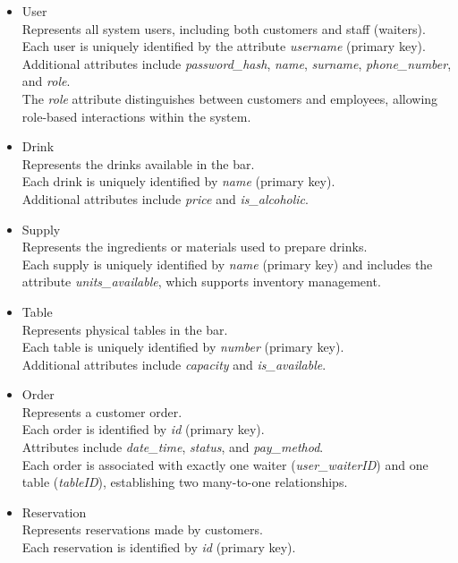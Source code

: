 \documentclass[a4paper]{article}
\begin{document}
\begin{itemize}
\item
  User\\
  Represents all system users, including both customers and staff
  (waiters).\\
  Each user is uniquely identified by the attribute \emph{username}
  (primary key).\\
  Additional attributes include \emph{password\_hash}, \emph{name},
  \emph{surname}, \emph{phone\_number}, and
  \emph{role}.\\
  The \emph{role} attribute distinguishes between customers and
  employees, allowing role-based interactions within the system.
\item
  Drink\\
  Represents the drinks available in the bar.\\
  Each drink is uniquely identified by \emph{name} (primary key).\\
  Additional attributes include \emph{price} and \emph{is\_alcoholic}.
\item
  Supply\\
  Represents the ingredients or materials used to prepare drinks.\\
  Each supply is uniquely identified by \emph{name} (primary key) and
  includes the attribute \emph{units\_available}, which supports
  inventory management.
\item
  Table\\
  Represents physical tables in the bar.\\
  Each table is uniquely identified by \emph{number} (primary key).\\
  Additional attributes include \emph{capacity} and
  \emph{is\_available}.
\item
  Order\\
  Represents a customer order.\\
  Each order is identified by \emph{id} (primary key).\\
  Attributes include \emph{date\_time}, \emph{status}, and
  \emph{pay\_method}.\\
  Each order is associated with exactly one waiter
  (\emph{user\_waiterID}) and one table (\emph{tableID}), establishing
  two many-to-one relationships.
\item
  Reservation\\
  Represents reservations made by customers.\\
  Each reservation is identified by \emph{id} (primary key).\\

\end{itemize}
\end{document}
